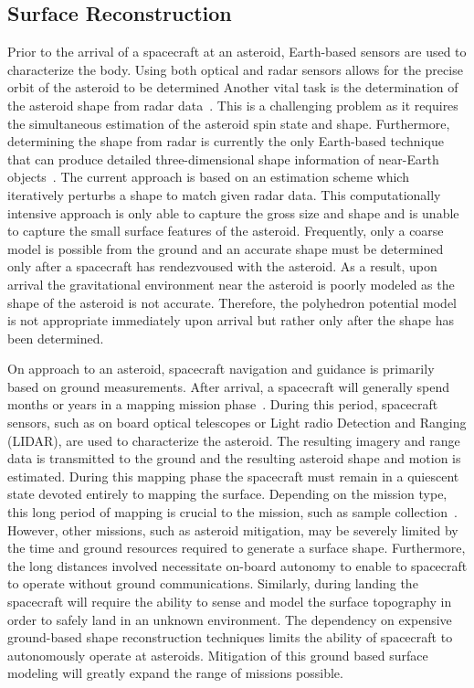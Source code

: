 \subsection{Surface Reconstruction}

Prior to the arrival of a spacecraft at an asteroid, Earth-based sensors are used to characterize the body.
Using both optical and radar sensors allows for the precise orbit of the asteroid to be determined
Another vital task is the determination of the asteroid shape from radar data~\cite{hudson1994,busch2011}.
This is a challenging problem as it requires the simultaneous estimation of the asteroid spin state and shape.
Furthermore, determining the shape from radar is currently the only Earth-based technique that can produce detailed three-dimensional shape information of near-Earth objects~\cite{greenberg2015}.
The current approach is based on an estimation scheme which iteratively perturbs a shape to match given radar data.
This computationally intensive approach is only able to capture the gross size and shape and is unable to capture the small surface features of the asteroid.
Frequently, only a coarse model is possible from the ground and an accurate shape must be determined only after a spacecraft has rendezvoused with the asteroid.
As a result, upon arrival the gravitational environment near the asteroid is poorly modeled as the shape of the asteroid is not accurate.
Therefore, the polyhedron potential model is not appropriate immediately upon arrival but rather only after the shape has been determined.

On approach to an asteroid, spacecraft navigation and guidance is primarily based on ground measurements.
After arrival, a spacecraft will generally spend months or years in a mapping mission phase~\cite{kubota2003,cole1998}.
During this period, spacecraft sensors, such as on board optical telescopes or Light radio Detection and Ranging (LIDAR), are used to characterize the asteroid.
The resulting imagery and range data is transmitted to the ground and the resulting asteroid shape and motion is estimated. 
During this mapping phase the spacecraft must remain in a quiescent state devoted entirely to mapping the surface.
Depending on the mission type, this long period of mapping is crucial to the mission, such as sample collection~\cite{gates2015}. 
However, other missions, such as asteroid mitigation, may be severely limited by the time and ground resources required to generate a surface shape.
Furthermore, the long distances involved necessitate on-board autonomy to enable to spacecraft to operate without ground communications.
Similarly, during landing the spacecraft will require the ability to sense and model the surface topography in order to safely land in an unknown environment.
The dependency on expensive ground-based shape reconstruction techniques limits the ability of spacecraft to autonomously operate at asteroids.
Mitigation of this ground based surface modeling will greatly expand the range of missions possible.


